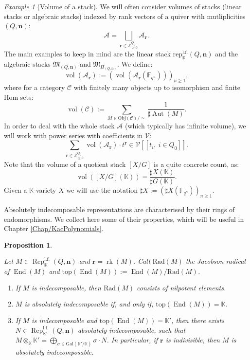 \documentclass[11pt,english]{article}
\numberwithin{equation}{section}
\numberwithin{figure}{section}
\theoremstyle{definition}
\theoremstyle{plain}
\newtheorem{prop}[df]{Proposition}
\theoremstyle{remark}
\newtheorem{exmp}[df]{Example}
\DeclareMathOperator{\End}{End}
\DeclareMathOperator{\Aut}{Aut}
\DeclareMathOperator{\rk}{rk}
\DeclareMathOperator{\Rep}{Rep}
\DeclareMathOperator{\vol}{vol}
\newcommand\nn{\mathbf{n}}
\newcommand\rr{\mathbf{r}}
\newcommand\ZZ{\mathbb{Z}}
\newcommand\FF{\mathbb{F}}
\newcommand\KK{\mathbb{K}}
\begin{document}
\begin{exmp}[Volume of a stack]

We will often consider volumes of stacks (linear stacks or algebraic
stacks) indexed by rank vectors of a quiver with mutliplicities $(Q,\nn)$:\[
\mathcal{A}=\bigsqcup_{\rr\in\ZZ_{\geq0}^{Q_0}}\mathcal{A}_{\rr}.
\] The main examples to keep in mind are the linear stack $\mathrm{rep}_{\KK}^{\mathrm{l.f.}}(Q,\nn)$
and the algebraic stacks $\mathfrak{M}_{(Q,\nn)}$ and $\mathfrak{M}_{\Pi_{(Q,\nn)}}$.
We define:\[
\vol(\mathcal{A}_{\rr}):=\left(\vol(\mathcal{A}_{\rr}(\FF_{q^n}))\right)_{n\geq1},
\] where for a category $\mathcal{C}$ with finitely many objects up
to isomorphism and finite Hom-sets:\[
\vol(\mathcal{C}):=\sum_{M\in\mathrm{Obj}(\mathcal{C})/\simeq}\frac{1}{\sharp\Aut(M)}.
\]In order to deal with the whole stack $\mathcal{A}$ (which typically
has infinite volume), we will work with power series with coefficients
in $\mathcal{V}$:\[
\sum_{\rr\in\ZZ_{\geq0}^{Q_{0}}}\vol(\mathcal{A}_{\rr})\cdot t^{\rr}\in\mathcal{V}[[t_{i},\ i\in Q_{0}]].
\]Note that the volume of a quotient stack $\left[X/G\right]$ is a
quite concrete count, as:\[
\vol\left([X/G](\KK)\right)=\frac{\sharp X(\KK)}{\sharp G(\KK)}.
\]Given a $\KK$-variety $X$ we will use the notation $\sharp X:=(\sharp X(\FF_{q^{n}}))_{n\geq1}$.

\end{exmp}

Absolutely indecomposable representations are characterised by their
rings of endomorphisms. We collect here some of their properties,
which will be useful in Chapter \ref{Chap/KacPolynomials}.

\begin{prop} \label{Prop/EndRings}

Let $M\in\Rep_{\KK}^{\mathrm{l.f.}}(Q,\nn)$ and $\rr=\rk(M)$. Call
$\mathrm{Rad}(M)$ the Jacobson radical of $\End(M)$ and $\mathrm{top}(\End(M)):=\End(M)/\mathrm{Rad}(M)$.
\begin{enumerate}
\item If $M$ is indecomposable, then $\mathrm{Rad}(M)$ consists of nilpotent
elements.
\item $M$ is absolutely indecomposable if, and only if, $\mathrm{top}(\End(M))=\KK$.
\item If $M$ is indecomposable and $\mathrm{top}(\End(M))=\KK'$, then
there exists $N\in\Rep_{\KK'}^{\mathrm{l.f.}}(Q,\nn)$ absolutely
indecomposable, such that $M\otimes_{\KK}\KK'=\bigoplus_{\sigma\in\mathrm{Gal}(\KK'/\KK)}\sigma\cdot N$.
In particular, if $\rr$ is indivisible, then $M$ is absolutely indecomposable.
\end{enumerate}
\end{prop}
\end{document}
